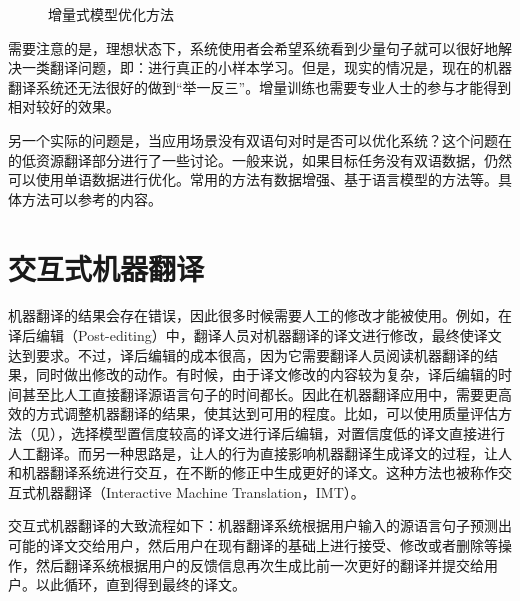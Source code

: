 \begin{figure}[htp]
\centering

\caption{增量式模型优化方法}
\label{fig:18-1}
\end{figure}

\parinterval 需要注意的是，理想状态下，系统使用者会希望系统看到少量句子就可以很好地解决一类翻译问题，即：进行真正的小样本学习。但是，现实的情况是，现在的机器翻译系统还无法很好的做到“举一反三”。增量训练也需要专业人士的参与才能得到相对较好的效果。

\parinterval 另一个实际的问题是，当应用场景没有双语句对时是否可以优化系统？这个问题在{\chaptersixteen}的低资源翻译部分进行了一些讨论。一般来说，如果目标任务没有双语数据，仍然可以使用单语数据进行优化。常用的方法有数据增强、基于语言模型的方法等。具体方法可以参考{\chaptersixteen}的内容。

\sectionnewpage
\section{交互式机器翻译}

\parinterval 机器翻译的结果会存在错误，因此很多时候需要人工的修改才能被使用。例如，在{\small\bfnew 译后编辑}（Post-editing）中，翻译人员对机器翻译的译文进行修改，最终使译文达到要求。不过，译后编辑的成本很高，因为它需要翻译人员阅读机器翻译的结果，同时做出修改的动作。有时候，由于译文修改的内容较为复杂，译后编辑的时间甚至比人工直接翻译源语言句子的时间都长。因此在机器翻译应用中，需要更高效的方式调整机器翻译的结果，使其达到可用的程度。比如，可以使用质量评估方法（见{\chapterfour}），选择模型置信度较高的译文进行译后编辑，对置信度低的译文直接进行人工翻译。而另一种思路是，让人的行为直接影响机器翻译生成译文的过程，让人和机器翻译系统进行交互，在不断的修正中生成更好的译文。这种方法也被称作{\small\bfnew 交互式机器翻译}（Interactive Machine Translation，IMT）。

\parinterval 交互式机器翻译的大致流程如下：机器翻译系统根据用户输入的源语言句子预测出可能的译文交给用户，然后用户在现有翻译的基础上进行接受、修改或者删除等操作，然后翻译系统根据用户的反馈信息再次生成比前一次更好的翻译并提交给用户。以此循环，直到得到最终的译文。

